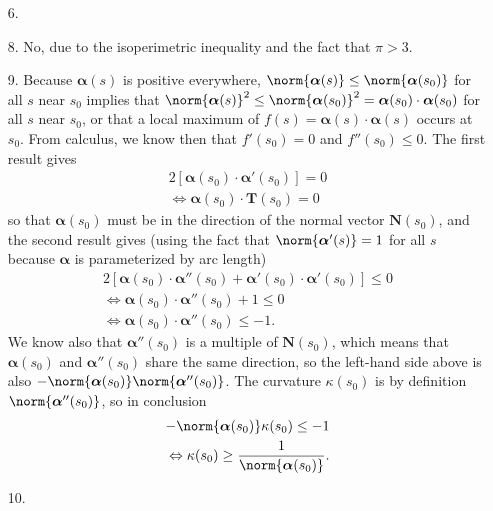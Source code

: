 \documentclass[a4paper,12pt]{article}
\newcommand{\bs}{\boldsymbol}
\theoremstyle{remark}
\begin{document}
\begin{enumerate}
    \item[6.]

    \item[8.]
        No, due to the isoperimetric inequality and the fact that $\pi > 3$.

    \item[9.]
        Because $\bs{\alpha}(s)$ is positive everywhere, $\norm{\bs{\alpha}(s)} \leq \norm{\bs{\alpha}(s_0)}$ for all $s$ near $s_0$ implies that $\norm{\bs{\alpha}(s)}^2 \leq \norm{\bs{\alpha}(s_0)}^2 = \bs{\alpha}(s_0) \cdot \bs{\alpha}(s_0)$ for all $s$ near $s_0$, or that a local maximum of $f(s) = \bs{\alpha}(s) \cdot \bs{\alpha}(s)$ occurs at $s_0$. From calculus, we know then that $f'(s_0) = 0$ and $f''(s_0) \leq 0$. The first result gives
        \begin{gather*}
            2[\bs{\alpha}(s_0) \cdot \bs{\alpha}'(s_0)] = 0 \\
            \Leftrightarrow \bs{\alpha}(s_0) \cdot \bs{T}(s_0) = 0
        \end{gather*}
        so that $\bs{\alpha}(s_0)$ must be in the direction of the normal vector $\bs{N}(s_0)$, and the second result gives (using the fact that $\norm{\bs{\alpha}'(s)} = 1$ for all $s$ because $\bs{\alpha}$ is parameterized by arc length)
        \begin{gather*}
            2[\bs{\alpha}(s_0) \cdot \bs{\alpha}''(s_0) + \bs{\alpha}'(s_0) \cdot \bs{\alpha}'(s_0)] \leq 0 \\
            \Leftrightarrow \bs{\alpha}(s_0) \cdot \bs{\alpha}''(s_0) + 1 \leq 0 \\
            \Leftrightarrow \bs{\alpha}(s_0) \cdot \bs{\alpha}''(s_0) \leq -1.
        \end{gather*}
        We know also that $\bs{\alpha}''(s_0)$ is a multiple of $\bs{N}(s_0)$, which means that $\bs{\alpha}(s_0)$ and $\bs{\alpha}''(s_0)$ share the same direction, so the left-hand side above is also $-\norm{\bs{\alpha}(s_0)} \norm{\bs{\alpha}''(s_0)}$. The curvature $\kappa(s_0)$ is by definition $\norm{\bs{\alpha}''(s_0)}$, so in conclusion
        \begin{align*}
            -\norm{\bs{\alpha}(s_0)} \kappa(s_0) \leq -1 \\
            \Leftrightarrow \kappa(s_0) \geq \frac{1}{\norm{\bs{\alpha}(s_0)}}.
        \end{align*}
    \item[10.]

\end{enumerate}
\end{document}
